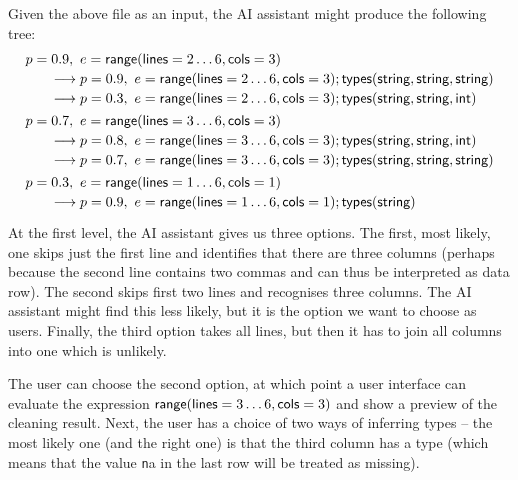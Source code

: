 \documentclass{article}
\begin{document}
Given the above file as an input, the AI assistant might produce the following tree:
%
\begin{equation*}
\begin{array}{l}
p=0.9,~ e=\textnormal{\sffamily range}(\textnormal{\sffamily lines}=2\ldots 6, \textnormal{\sffamily cols}=3)\\[0.2em]
\qquad\longrightarrow p=0.9,~ e=\textnormal{\sffamily range}(\textnormal{\sffamily lines}=2\ldots 6, \textnormal{\sffamily cols}=3); \textnormal{\sffamily types}(\textnormal{\sffamily string},\textnormal{\sffamily string},\textnormal{\sffamily string})\\[0.2em]
\qquad\longrightarrow p=0.3,~ e=\textnormal{\sffamily range}(\textnormal{\sffamily lines}=2\ldots 6, \textnormal{\sffamily cols}=3); \textnormal{\sffamily types}(\textnormal{\sffamily string},\textnormal{\sffamily string},\textnormal{\sffamily int})\\[0.4em]
p=0.7,~ e=\textnormal{\sffamily range}(\textnormal{\sffamily lines}=3\ldots 6, \textnormal{\sffamily cols}=3)\\[0.2em]
\qquad\longrightarrow p=0.8,~ e=\textnormal{\sffamily range}(\textnormal{\sffamily lines}=3\ldots 6, \textnormal{\sffamily cols}=3); \textnormal{\sffamily types}(\textnormal{\sffamily string},\textnormal{\sffamily string},\textnormal{\sffamily int})\\[0.2em]
\qquad\longrightarrow p=0.7,~ e=\textnormal{\sffamily range}(\textnormal{\sffamily lines}=3\ldots 6, \textnormal{\sffamily cols}=3); \textnormal{\sffamily types}(\textnormal{\sffamily string},\textnormal{\sffamily string},\textnormal{\sffamily string})\\[0.4em]
p=0.3,~ e=\textnormal{\sffamily range}(\textnormal{\sffamily lines}=1\ldots 6, \textnormal{\sffamily cols}=1)\\[0.2em]
\qquad\longrightarrow p=0.9,~ e=\textnormal{\sffamily range}(\textnormal{\sffamily lines}=1\ldots 6, \textnormal{\sffamily cols}=1); \textnormal{\sffamily types}(\textnormal{\sffamily string})\\[0.2em]
\end{array}
\end{equation*}
%
At the first level, the AI assistant gives us three options. The first, most likely, one skips just 
the first line and identifies that there are three columns (perhaps because the second line contains 
two commas and can thus be interpreted as data row). The second skips first two lines and recognises
three columns. The AI assistant might find this less likely, but it is the option we want to choose
as users. Finally, the third option takes all lines, but then it has to join all columns into one
which is unlikely.

The user can choose the second option, at which point a user interface can evaluate the 
expression $\textnormal{\sffamily range}(\textnormal{\sffamily lines}=3\ldots 6, \textnormal{\sffamily cols}=3)$ and show a preview of 
the cleaning result. Next, the user has a choice of two ways of inferring types -- the most 
likely one (and the right one) is that the third column has a type  (which means that
the value {\texttt na} in the last row will be treated as missing).
\end{document}
